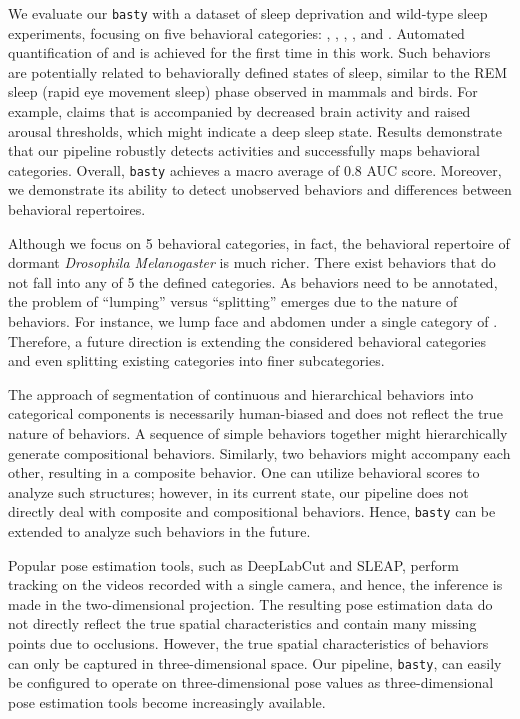 We evaluate our \texttt{basty} with a dataset of sleep deprivation and wild-type sleep experiments, focusing on five behavioral categories: \Grooming, \Feeding, \ProboscisPumping, \HaltereSwitch, and \PosturalAdjustment.
Automated quantification of \ProboscisPumping and \HaltereSwitch is achieved for the first time in this work.
Such behaviors are potentially related to behaviorally defined states of sleep, similar to the REM sleep (rapid eye movement sleep) phase observed in mammals and birds.
For example, \citet{van_alphen_deep_2021} claims that \ProboscisPumping is accompanied by decreased brain activity and raised arousal thresholds, which might indicate a deep sleep state.
Results demonstrate that our pipeline robustly detects activities and successfully maps behavioral categories.
Overall, \texttt{basty} achieves a macro average of 0.8 AUC score.
Moreover, we demonstrate its ability to detect unobserved behaviors and differences between behavioral repertoires.

Although we focus on 5 behavioral categories, in fact, the behavioral repertoire of dormant \textit{Drosophila Melanogaster} is much richer. There exist behaviors that do not fall into any of 5 the defined categories.
As behaviors need to be annotated, the problem of ``lumping'' versus ``splitting'' emerges due to the nature of behaviors. For instance, we lump face \Grooming and abdomen \Grooming under a single category of \Grooming.
Therefore, a future direction is extending the considered behavioral categories and even splitting existing categories into finer subcategories.

The approach of segmentation of continuous and hierarchical behaviors into categorical components is necessarily human-biased and does not reflect the true nature of behaviors.
A sequence of simple behaviors together might hierarchically generate compositional behaviors.
Similarly, two behaviors might accompany each other, resulting in a composite behavior.
One can utilize behavioral scores to analyze such structures; however, in its current state, our pipeline does not directly deal with composite and compositional behaviors.
Hence, \texttt{basty} can be extended to analyze such behaviors in the future.

Popular pose estimation tools, such as DeepLabCut and SLEAP, perform tracking on the videos recorded with a single camera, and hence, the inference is made in the two-dimensional projection.
The resulting pose estimation data do not directly reflect the true spatial characteristics and contain many missing points due to occlusions.
However, the true spatial characteristics of behaviors can only be captured in three-dimensional space.
Our pipeline, \texttt{basty}, can easily be configured to operate on three-dimensional pose values as three-dimensional pose estimation tools become  increasingly available.
